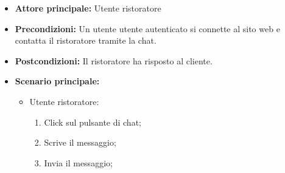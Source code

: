 \label{usecase:Chat col cliente}
\begin{itemize}
	\item \textbf{Attore principale:}  Utente ristoratore
	\item \textbf{Precondizioni:}
	      Un utente utente autenticato si connette al sito web e contatta il
	      ristoratore tramite la chat.
	\item \textbf{Postcondizioni:}
	      Il ristoratore ha risposto al cliente.
	\item \textbf{Scenario principale:}
	      \begin{itemize}
		      \item  Utente ristoratore:
		            \begin{enumerate}
			            \item Click sul pulsante di chat;
			            \item Scrive il messaggio;
			            \item Invia il messaggio;
		            \end{enumerate}
	      \end{itemize}
\end{itemize}
